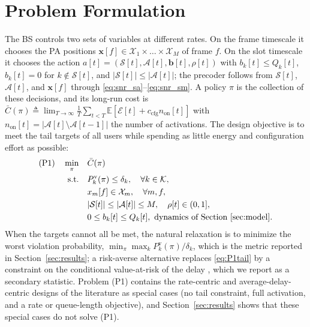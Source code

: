 \documentclass[journal]{IEEEtran}
\newcommand{\E}{\mathbb{E}}
\newcommand{\vect}[1]{\bm{#1}}
\newcommand{\Sset}{\mathcal{S}}
\newcommand{\Kset}{\mathcal{K}}
\begin{document}
\section{Problem Formulation}\label{sec:problem}
The BS controls two sets of variables at different rates. On the frame timescale it chooses the PA positions $\vect x[f]\in\mathcal X_1\times\dots\times\mathcal X_M$ of frame $f$. On the slot timescale it chooses the action $a[t]=(\Sset[t],\mathcal A[t],\vect b[t],\rho[t])$ with $b_k[t]\le Q_k[t]$, $b_k[t]=0$ for $k\notin\Sset[t]$, and $|\Sset[t]|\le|\mathcal A[t]|$; the precoder follows from $\Sset[t]$, $\mathcal A[t]$, and $\vect x[f]$ through \eqref{eq:snr_sa}--\eqref{eq:snr_sm}. A policy $\pi$ is the collection of these decisions, and its long-run cost is $\bar C(\pi)\triangleq\lim_{T\to\infty}\frac1T\sum_{t<T}\E[\mathcal E[t]+c_{\mathrm{cfg}}n_{\mathrm{on}}[t]]$ with $n_{\mathrm{on}}[t]=|\mathcal A[t]\setminus\mathcal A[t-1]|$ the number of activations. The design objective is to meet the tail targets of all users while spending as little energy and configuration effort as possible:
\begin{subequations}\label{eq:P1}
\begin{align}
\text{(P1)}\quad\min_{\pi}\quad & \bar C(\pi)\label{eq:P1obj}\\
\text{s.t.}\quad & P_k^{\mathrm v}(\pi)\le\delta_k,\quad\forall k\in\Kset,\label{eq:P1tail}\\
& x_m[f]\in\mathcal X_m,\quad\forall m,f,\label{eq:P1x}\\
& |\Sset[t]|\le|\mathcal A[t]|\le M,\quad\rho[t]\in(0,1],\label{eq:P1sched}\\
& 0\le b_k[t]\le Q_k[t],\ \text{dynamics of Section~\ref{sec:model}}.\label{eq:P1dyn}
\end{align}
\end{subequations}
When the targets cannot all be met, the natural relaxation is to minimize the worst violation probability, $\min_\pi\max_k P_k^{\mathrm v}(\pi)/\delta_k$, which is the metric reported in Section~\ref{sec:results}; a risk-averse alternative replaces \eqref{eq:P1tail} by a constraint on the conditional value-at-risk of the delay \cite{Bennis2018}, which we report as a secondary statistic. Problem (P1) contains the rate-centric and average-delay-centric designs of the literature as special cases (no tail constraint, full activation, and a rate or queue-length objective), and Section~\ref{sec:results} shows that these special cases do not solve (P1).
\end{document}
